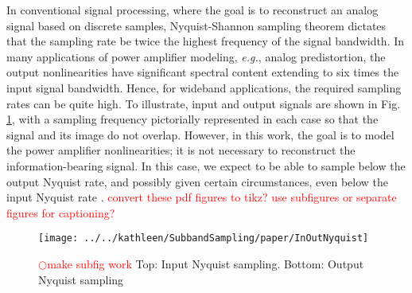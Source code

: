 In conventional signal processing, where the goal is to reconstruct an analog signal based on discrete samples, Nyquist-Shannon sampling theorem dictates that the sampling rate be twice the highest frequency of the signal bandwidth\cite{Liu96Spec}.  In many applications of power amplifier modeling, \textit{e.g.}, analog predistortion, the output nonlinearities have significant spectral content extending to six times the input signal bandwidth\cite{Park02Adap}.  Hence, for wideband applications, the required sampling rates can be quite high.  To illustrate, input and output signals are shown in Fig. \ref{fig_Nyquist}, with a sampling frequency pictorially represented in each case so that the signal and its image do not overlap.  However, in this work, the goal is to model the power amplifier nonlinearities; it is not necessary to reconstruct the information-bearing signal.   In this case, we expect to be able to sample below the output Nyquist rate, and possibly given certain circumstances, even below the input Nyquist rate
\cite{Liu96Spec}\cite{Park02Adap}.  \textcolor{red}{ convert these pdf figures to tikz?  use subfigures or separate figures for captioning?}

\begin{figure}[t!]   %
\centering
\texttt{[image: ../../kathleen/SubbandSampling/paper/InOutNyquist]}
\caption{\textcolor{red} {$\bigcirc$make subfig work}  Top:  Input Nyquist sampling.  Bottom:  Output Nyquist sampling}
\label{fig_Nyquist}
\end{figure}


